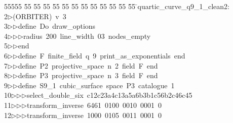 %
%
\begin{tabbing}
55555 \= 55 \= 55 \= 55 \= 55 \= 55 \= 55 \= 55 \= 55 \= 55 \= 55 \= 55 \= 55 \= \>quartic\_curve\_q9\_1\_clean2:\\[0pt]
2\>$\triangleright$\>(ORBITER)\ v\ 3\ \\[0pt]
3\>$\triangleright$\>$\triangleright$\>define\ Do\ draw\_options\ \\[0pt]
4\>$\triangleright$\>$\triangleright$\>$\triangleright$\>radius\ 200\ line\_width\ 03\ nodes\_empty\ \\[0pt]
5\>$\triangleright$\>$\triangleright$\>end\ \\[0pt]
6\>$\triangleright$\>$\triangleright$\>define\ F\ finite\_field\ q\ 9\ print\_as\_exponentials\ end\ \\[0pt]
7\>$\triangleright$\>$\triangleright$\>define\ P2\ projective\_space\ n\ 2\ field\ F\ end\ \\[0pt]
8\>$\triangleright$\>$\triangleright$\>define\ P3\ projective\_space\ n\ 3\ field\ F\ end\ \\[0pt]
9\>$\triangleright$\>$\triangleright$\>define\ S9\_1\ cubic\_surface\ space\ P3\ catalogue\ 1\ \\[0pt]
10\>$\triangleright$\>$\triangleright$\>$\triangleright$\>select\_double\_six\ c12c23a4c13a5a6b3b1c56b2c46c45\ \\[0pt]
11\>$\triangleright$\>$\triangleright$\>$\triangleright$\>transform\_inverse\ 6461\ 0100\ 0010\ 0001\ 0\ \\[0pt]
12\>$\triangleright$\>$\triangleright$\>$\triangleright$\>transform\_inverse\ 1000\ 0105\ 0011\ 0001\ 0\ \\[0pt]

\end{tabbing}
